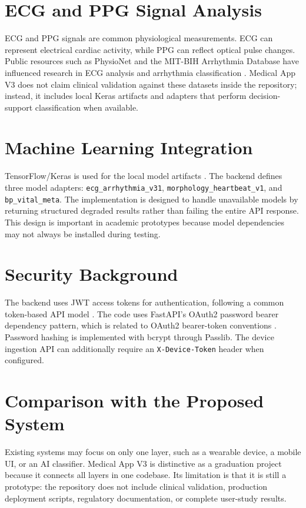 \section{ECG and PPG Signal Analysis}

ECG and PPG signals are common physiological measurements. ECG can represent electrical cardiac activity, while PPG can reflect optical pulse changes. Public resources such as PhysioNet and the MIT-BIH Arrhythmia Database have influenced research in ECG analysis and arrhythmia classification \cite{physionet,mitbih}. Medical App V3 does not claim clinical validation against these datasets inside the repository; instead, it includes local Keras artifacts and adapters that perform decision-support classification when available.

\section{Machine Learning Integration}

TensorFlow/Keras is used for the local model artifacts \cite{tensorflow}. The backend defines three model adapters: \texttt{ecg\_arrhythmia\_v31}, \texttt{morphology\_heartbeat\_v1}, and \texttt{bp\_vital\_meta}. The implementation is designed to handle unavailable models by returning structured degraded results rather than failing the entire API response. This design is important in academic prototypes because model dependencies may not always be installed during testing.

\section{Security Background}

The backend uses JWT access tokens for authentication, following a common token-based API model \cite{jwt}. The code uses FastAPI's OAuth2 password bearer dependency pattern, which is related to OAuth2 bearer-token conventions \cite{oauth2}. Password hashing is implemented with bcrypt through Passlib. The device ingestion API can additionally require an \texttt{X-Device-Token} header when configured.

\section{Comparison with the Proposed System}

Existing systems may focus on only one layer, such as a wearable device, a mobile UI, or an AI classifier. Medical App V3 is distinctive as a graduation project because it connects all layers in one codebase. Its limitation is that it is still a prototype: the repository does not include clinical validation, production deployment scripts, regulatory documentation, or complete user-study results.
